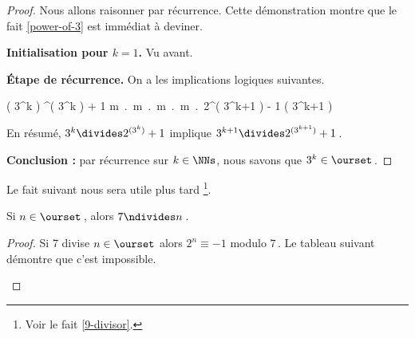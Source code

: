 \begin{proof}
	Nous allons raisonner par récurrence. Cette démonstration montre que le fait \ref{power-of-3} est immédiat à deviner.
    
    \medskip
    
    \textbf{Initialisation pour $k = 1$.}    
    Vu avant.
    
    
    \medskip
    
    \textbf{Étape de récurrence.}    
    On a les implications logiques suivantes.
    
    \medskip
    
    \begin{stepcalc}[style=ar*, ope=\implies]
    	( 3^k ) ^{( 3^k )} + 1
    \explnext{}
    	\exists m \in \ZZ \,.\, \Big[ 2^{( 3^k )} + 1 = m \cdot 3^k  \Big]
    \explnext{}
    	\exists m \in \ZZ \,.\, \Big[ 2^{( 3^k )} = - 1 + m \cdot 3^k  \Big]
    \explnext{}
    	\exists m \in \ZZ \,.\, \Big[ \big( 2^{( 3^k )} \big)^3 = \big( - 1 + m \cdot 3^k \big)^3  \Big]
    \explnext{}
    	\exists m \in \ZZ \,.\, \Big[ 2^{( 3^{k+1} )} = - 1 + 3 \cdot m \cdot 3^k - 3 \cdot \big( m \cdot 3^k \big)^2 + \big( m \cdot 3^k \big)^3  \Big]
    	2^{( 3^{k+1} )} \equiv - 1 \mod\!( 3^{k+1} )
    \end{stepcalc}
    
    \smallskip
    
    En résumé, 
    $3^k \divides 2^{( 3^k )} + 1$ 
    implique
    $3^{k+1} \divides 2^{( 3^{k+1} )} + 1$\,.
    
    \medskip
    
    \textbf{Conclusion :} par récurrence sur $k \in \NNs$, nous savons que $3^k \in \ourset$\,.
\end{proof}




Le fait suivant nous sera utile plus tard
\footnote{
	Voir le fait \ref{9-divisor}.
}.

\begin{fact} \label{not-7-divisor}
	Si $n \in \ourset$\,, alors $7 \ndivides n$\,.
\end{fact}

\begin{proof}
	Si $7$ divise $n \in \ourset$ alors $2^n \equiv -1$ modulo $7$\,.
	Le tableau suivant démontre que c'est impossible.
	\begin{center}
	\end{center}

    \leavevmode
\end{proof}



